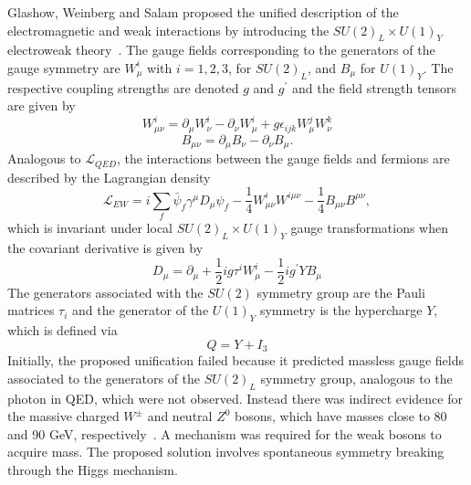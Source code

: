 Glashow, Weinberg and Salam proposed the unified description of the electromagnetic and weak interactions by introducing the $SU(2)_L \times U(1)_Y$ electroweak theory~\cite{Glashow1961579,Salam1964168,PhysRevLett.19.1264}. The gauge fields corresponding to the generators of the gauge symmetry are $W^i_{\mu}$  with $i=1,2,3$, for $SU(2)_L$, and $B_{\mu}$ for $U(1)_Y$.  The respective coupling strengths are denoted $g$ and $g^{\prime}$ and the field strength tensors are given by
%
\begin{equation}
W^i_{\mu\nu} = \partial_{\mu} W^i_{\nu} - \partial_{\nu} W^i_{\mu} + g \epsilon_{ijk} W^j_{\mu} W^k_{\nu} 
\end{equation}
\begin{equation}
B_{\mu\nu} = \partial_{\mu} B_{\nu} - \partial_{\nu} B_{\mu}.
\end{equation}
%
Analogous to $\mathcal{L}_{QED}$, the interactions between the gauge fields and fermions are described by the Lagrangian density 
%
\begin{equation}
\mathcal{L}_{EW} =  i\sum_f\bar{\psi}_f\gamma^{\mu} D_{\mu}\psi_f - \frac{1}{4} W^i_{\mu\nu}W^{i\mu\nu} - \frac{1}{4} B_{\mu\nu}B^{\mu\nu},
\end{equation}
%
which is invariant under local $SU(2)_L \times U(1)_Y$ gauge transformations when the covariant derivative is given by
%
\begin{equation}
D_{\mu} = \partial_{\mu} + \frac{1}{2}i g \tau^i W^i_{\mu} - \frac{1}{2}i g^{\prime} Y B_{\mu}  
\end{equation}
%
The generators associated with the $SU(2)$  symmetry group are the Pauli matrices $\tau_i$ and the generator of the $U(1)_Y$ symmetry is the hypercharge $Y$, which is defined via
%
\begin{equation}
Q = Y + I_3
\end{equation}
%
Initially, the proposed unification failed because it predicted massless gauge fields associated to the generators of the $SU(2)_L$ symmetry group, analogous to the photon in QED, which were not observed. Instead there was indirect evidence for the massive charged $W^{\pm}$ and neutral $Z^0$ bosons, which have masses close to 80 and 90 GeV, respectively~\cite{Banner1983476,Arnison1983398}. A mechanism was required for the weak bosons to acquire mass. The proposed solution involves spontaneous symmetry breaking through the Higgs mechanism.

